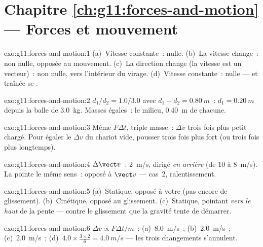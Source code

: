 \section*{Chapitre \ref{ch:g11:forces-and-motion} --- Forces et mouvement}

\begin{solution}{exo:g11:forces-and-motion:1}
(a)~Vitesse constante~: 
nulle. (b)~La vitesse change~: non nulle, opposée au mouvement.
(c)~La direction change (la vitesse est un vecteur)~: non nulle, vers
l'intérieur du virage. (d)~Vitesse constante~: nulle ---
 et traînée
se .
\end{solution}

\begin{solution}{exo:g11:forces-and-motion:2}
$d_1/d_2 = 1.0/3.0$ avec $d_1 + d_2 = \qty{0.80}{m}$~:
$d_1 = \qty{0.20}{m}$ depuis la balle de \qty{3.0}{kg}. Masses égales~:
le milieu, \qty{0.40}{m} de chacune.
\end{solution}

\begin{solution}{exo:g11:forces-and-motion:3}
Même $F\Delta t$, triple masse~: $\Delta v$ trois fois plus petit
chargé. Pour égaler le $\Delta v$ du chariot vide, pousser trois fois
plus fort (ou trois fois plus longtemps).
\end{solution}

\begin{solution}{exo:g11:forces-and-motion:4}
$\Delta \vect v$~: \qty{2}{m/s}, dirigé \emph{en arrière} (de
\num{10} à \qty{8}{m/s}). La
 pointe le même sens~:
opposé à $\vect v$ --- cas~2, ralentissement.
\end{solution}

\begin{solution}{exo:g11:forces-and-motion:5}
(a)~Statique, opposé à votre  (pas encore de glissement).
(b)~Cinétique, opposé au glissement. (c)~Statique, pointant
\emph{vers le haut} de la pente --- contre le glissement que la
gravité tente de démarrer.
\end{solution}

\begin{solution}{exo:g11:forces-and-motion:6}
$\Delta v \propto F\Delta t/m$~: (a)~\qty{8.0}{m/s}~; (b)~\qty{2.0}{m/s}~;
(c)~\qty{2.0}{m/s}~; (d)~$4.0 \times \frac{3 \times 2}{6} =
\qty{4.0}{m/s}$ --- les trois changements s'annulent.
\end{solution}

